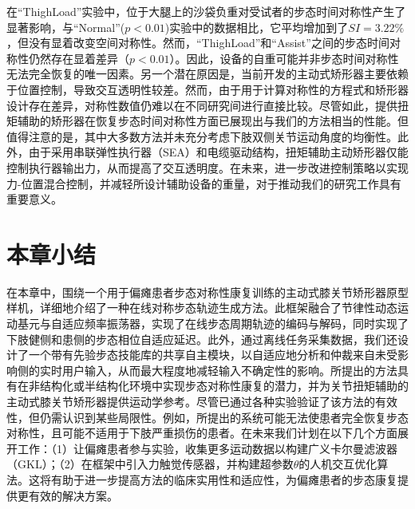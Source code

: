 在``ThighLoad''实验中，位于大腿上的沙袋负重对受试者的步态时间对称性产生了显著影响，与``Normal''($p<0.01$)实验中的数据相比，它平均增加到了${SI}=3.22 \%$，但没有显着改变空间对称性。然而，``ThighLoad''和``Assist''之间的步态时间对称性仍然存在显着差异（$p<0.01$）。因此，设备的自重可能并非步态时间对称性无法完全恢复的唯一因素。另一个潜在原因是，当前开发的主动式矫形器主要依赖于位置控制，导致交互透明性较差。然而，由于用于计算对称性的方程式和矫形器设计存在差异，对称性数值仍难以在不同研究间进行直接比较。尽管如此，提供扭矩辅助的矫形器在恢复步态时间对称性方面已展现出与我们的方法相当的性能。但值得注意的是，其中大多数方法并未充分考虑下肢双侧关节运动角度的均衡性。此外，由于采用串联弹性执行器（SEA）和电缆驱动结构，扭矩辅助主动矫形器仅能控制执行器输出力，从而提高了交互透明度。在未来，进一步改进控制策略以实现力-位置混合控制，并减轻所设计辅助设备的重量，对于推动我们的研究工作具有重要意义。

\section{本章小结}
在本章中，围绕一个用于偏瘫患者步态对称性康复训练的主动式膝关节矫形器原型样机，详细地介绍了一种在线对称步态轨迹生成方法。此框架融合了节律性动态运动基元与自适应频率振荡器，实现了在线步态周期轨迹的编码与解码，同时实现了下肢健侧和患侧的步态相位自适应延迟。此外，通过离线任务采集数据，我们还设计了一个带有先验步态技能库的共享自主模块，以自适应地分析和仲裁来自未受影响侧的实时用户输入，从而最大程度地减轻输入不确定性的影响。所提出的方法具有在非结构化或半结构化环境中实现步态对称性康复的潜力，并为关节扭矩辅助的主动式膝关节矫形器提供运动学参考。尽管已通过各种实验验证了该方法的有效性，但仍需认识到某些局限性。例如，所提出的系统可能无法使患者完全恢复步态对称性，且可能不适用于下肢严重损伤的患者。在未来我们计划在以下几个方面展开工作：（1）让偏瘫患者参与实验，收集更多运动数据以构建广义卡尔曼滤波器（GKL）；（2）在框架中引入力触觉传感器，并构建超参数$\theta$的人机交互优化算法。这将有助于进一步提高方法的临床实用性和适应性，为偏瘫患者的步态康复提供更有效的解决方案。